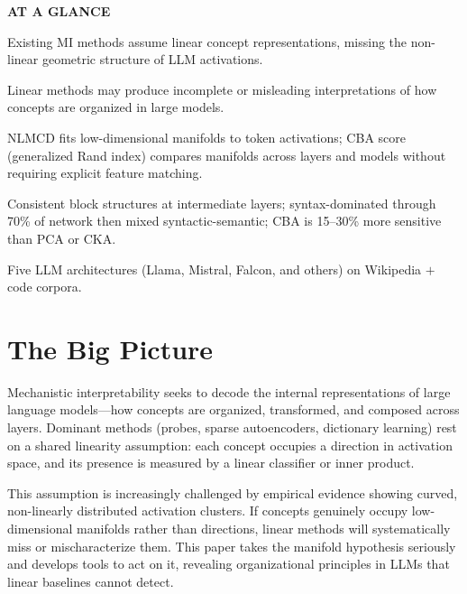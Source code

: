\documentclass[10pt,twocolumn]{article}
\begin{document}
\begin{mdframed}[backgroundcolor=boxgray,linecolor=rulered,linewidth=1pt,
    innerleftmargin=6pt,innerrightmargin=6pt,
    innertopmargin=6pt,innerbottommargin=6pt]
\textbf{\small AT A GLANCE}\par\vspace{4pt}
\begin{description}[leftmargin=0pt,labelsep=4pt,itemsep=2pt,parsep=0pt,
    font=\small\bfseries]
  \item[Problem:] Existing MI methods assume linear concept representations,
    missing the non-linear geometric structure of LLM activations.
  \item[Why it matters:] Linear methods may produce incomplete or misleading
    interpretations of how concepts are organized in large models.
  \item[Method:] NLMCD fits low-dimensional manifolds to token activations;
    CBA score (generalized Rand index) compares manifolds across layers and models
    without requiring explicit feature matching.
  \item[Result:] Consistent block structures at intermediate layers; syntax-dominated
    through 70\% of network then mixed syntactic-semantic; CBA is 15--30\% more
    sensitive than PCA or CKA.
  \item[Evidence:] Five LLM architectures (Llama, Mistral, Falcon, and others)
    on Wikipedia $+$ code corpora.
\end{description}
\end{mdframed}

\section{The Big Picture}

Mechanistic interpretability seeks to decode the internal representations of large
language models---how concepts are organized, transformed, and composed across layers.
Dominant methods (probes, sparse autoencoders, dictionary learning) rest on a shared
linearity assumption: each concept occupies a direction in activation space, and its
presence is measured by a linear classifier or inner product.

This assumption is increasingly challenged by empirical evidence showing curved,
non-linearly distributed activation clusters. If concepts genuinely occupy
low-dimensional manifolds rather than directions, linear methods will systematically
miss or mischaracterize them. This paper takes the manifold hypothesis seriously
and develops tools to act on it, revealing organizational principles in LLMs
that linear baselines cannot detect.
\end{document}
